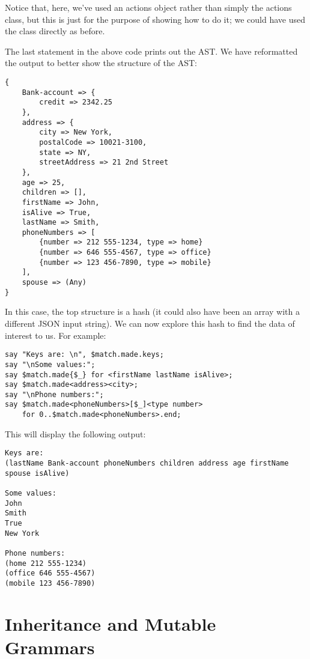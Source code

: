 Notice that, here, we've used an actions object rather than 
simply the actions class, but this is just for the purpose of 
showing how to do it; we could have used the class directly 
as before.

The last statement in the above code prints out the AST. 
We have reformatted the output to better show the 
structure of the AST:

\begin{verbatim}
{
    Bank-account => {
        credit => 2342.25
    }, 
    address => {
        city => New York, 
        postalCode => 10021-3100, 
        state => NY, 
        streetAddress => 21 2nd Street
    }, 
    age => 25, 
    children => [], 
    firstName => John, 
    isAlive => True, 
    lastName => Smith, 
    phoneNumbers => [
        {number => 212 555-1234, type => home} 
        {number => 646 555-4567, type => office} 
        {number => 123 456-7890, type => mobile}
    ], 
    spouse => (Any)
}
\end{verbatim}

In this case, the top structure is a hash (it could also have been 
an array with a different JSON input string). We can now explore 
this hash to find the data of interest to us. For example:

\begin{verbatim}
say "Keys are: \n", $match.made.keys;
say "\nSome values:";
say $match.made{$_} for <firstName lastName isAlive>;
say $match.made<address><city>;
say "\nPhone numbers:";
say $match.made<phoneNumbers>[$_]<type number> 
    for 0..$match.made<phoneNumbers>.end;
\end{verbatim}

This will display the following output:

\begin{verbatim}
Keys are:
(lastName Bank-account phoneNumbers children address age firstName spouse isAlive)

Some values:
John
Smith
True
New York

Phone numbers:
(home 212 555-1234)
(office 646 555-4567)
(mobile 123 456-7890)
\end{verbatim}

\section{Inheritance and Mutable Grammars}

